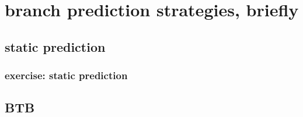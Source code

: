 \section{branch prediction strategies, briefly}

\subsection{static prediction}


\subsubsection{exercise: static prediction}


\subsection{BTB}

